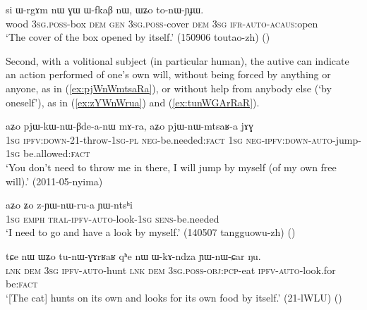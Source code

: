 \begin{exe}
\ex \label{ex:WZo.tonWYJW}
\gll si ɯ-rgɤm nɯ ɣɯ ɯ-fkaβ nɯ, ɯʑo to-nɯ-ɲɟɯ.  \\
wood \textsc{3sg}.\textsc{poss}-box \textsc{dem} \textsc{gen} \textsc{3sg}.\textsc{poss}-cover \textsc{dem} \textsc{3sg} \textsc{ifr}-\textsc{auto}-\textsc{acaus}:open \\
\glt `The cover of the box opened by itself.' (150906 toutao-zh)
()
\end{exe}

Second, with a volitional subject (in particular human), the autive can indicate an action performed of one's own will, without being forced by anything or anyone, as in (\ref{ex:pjWnWmtsaRa}), or without help from anybody else (`by oneself'), as in (\ref{ex:zYWnWrua}) and (\ref{ex:tunWGArRaR}).

\begin{exe}
\ex \label{ex:pjWnWmtsaRa}
\gll  aʑo pjɯ-kɯ-nɯ-βde-a-nɯ mɤ-ra, aʑo pjɯ-nɯ-mtsaʁ-a jɤɣ \\
\textsc{1sg} \textsc{ipfv}:\textsc{down}-2\fl{}1-throw-\textsc{1sg}-\textsc{pl} \textsc{neg}-be.needed:\textsc{fact} \textsc{1sg} \textsc{neg}-\textsc{ipfv}:\textsc{down}-\textsc{auto}-jump-\textsc{1sg} be.allowed:\textsc{fact} \\
\glt `You don't need to throw me in there, I will jump by myself (of my own free will).' (2011-05-nyima)
\end{exe}

\begin{exe}
\ex \label{ex:zYWnWrua}
\gll aʑo ʑo z-ɲɯ-nɯ-ru-a ɲɯ-ntsʰi \\
\textsc{1sg} \textsc{emph} \textsc{tral}-\textsc{ipfv}-\textsc{auto}-look-\textsc{1sg} \textsc{sens}-be.needed \\
\glt `I need to go and have a look by myself.' (140507 tangguowu-zh) ()
\end{exe} 

\begin{exe}
	\ex \label{ex:tunWGArRaR}
	\gll tɕe nɯ ɯʑo tu-nɯ-ɣɤrʁaʁ qʰe nɯ ɯ-kɤ-ndza ɲɯ-nɯ-ɕar ŋu. \\
	\textsc{lnk} \textsc{dem} \textsc{3sg} \textsc{ipfv}-\textsc{auto}-hunt \textsc{lnk} \textsc{dem} \textsc{3sg}.\textsc{poss}-\textsc{obj}:\textsc{pcp}-eat \textsc{ipfv}-\textsc{auto}-look.for be:\textsc{fact} \\
	\glt `[The cat] hunts on its own and looks for its own food by itself.' (21-lWLU)
()
\end{exe} 


